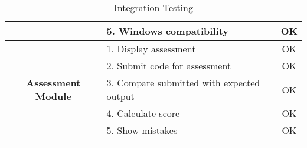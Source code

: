 \begin{longtable}[c]{|c|l|c|}
                                              & 5. Windows compatibility                    & OK               \\ \hline
\multirow{5}{*}{\textbf{Assessment Module}}   & 1. Display assessment                       & OK               \\ \cline{2-3} 
                                              & 2. Submit code for assessment               & OK               \\ \cline{2-3} 
                                              & 3. Compare submitted with expected output   & OK               \\ \cline{2-3} 
                                              & 4. Calculate score                          & OK               \\ \cline{2-3} 
                                              & 5. Show mistakes                            & OK               \\ \hline
\caption[Integration Testing]{Integration Testing}
\end{longtable}
